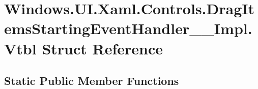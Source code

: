 \hypertarget{struct_windows_1_1_u_i_1_1_xaml_1_1_controls_1_1_drag_items_starting_event_handler_____impl_1_1_vtbl}{}\section{Windows.\+U\+I.\+Xaml.\+Controls.\+Drag\+Items\+Starting\+Event\+Handler\+\_\+\+\_\+\+Impl.\+Vtbl Struct Reference}
\label{struct_windows_1_1_u_i_1_1_xaml_1_1_controls_1_1_drag_items_starting_event_handler_____impl_1_1_vtbl}
\subsection*{Static Public Member Functions}
